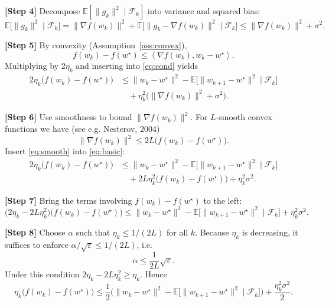 \documentclass{article}
\newcommand{\E}{\mathbb{E}}
\newcommand{\iprod}[2]{\left\langle #1,#2\right\rangle}
\begin{document}
\noindent\textbf{[Step 4]} Decompose $\E[\|g_k\|^{2}\mid\mathcal{F}_k]$ into variance and squared bias:
\begin{equation}
\E\!\big[\|g_k\|^{2}\mid\mathcal{F}_k\big]
= \|\nabla f(w_k)\|^{2} + \E\!\big[\|g_k-\nabla f(w_k)\|^{2}\mid\mathcal{F}_k\big]
\le \|\nabla f(w_k)\|^{2} + \sigma^{2}. \label{eq:variance}
\end{equation}

\noindent\textbf{[Step 5]} By convexity (Assumption~\ref{ass:convex}),
\[
f(w_k)-f(w^{\star})\le \iprod{\nabla f(w_k)}{w_k-w^{\star}} .
\]
Multiplying by $2\eta_k$ and inserting into \eqref{eq:cond} yields
\begin{align}
2\eta_k\big(f(w_k)-f(w^{\star})\big)
&\le \|w_k-w^{\star}\|^{2} - \E\!\big[\|w_{k+1}-w^{\star}\|^{2}\mid\mathcal{F}_k\big] \nonumber\\
&\quad + \eta_k^{2}\big(\|\nabla f(w_k)\|^{2}+\sigma^{2}\big). \label{eq:basic}
\end{align}

\noindent\textbf{[Step 6]} Use smoothness to bound $\|\nabla f(w_k)\|^{2}$.
For $L$‑smooth convex functions we have (see e.g. Nesterov, 2004)
\[
\|\nabla f(w_k)\|^{2}\le 2L\big(f(w_k)-f(w^{\star})\big). \label{eq:smooth}
\]
Insert \eqref{eq:smooth} into \eqref{eq:basic}:
\begin{align}
2\eta_k\big(f(w_k)-f(w^{\star})\big)
&\le \|w_k-w^{\star}\|^{2} - \E\!\big[\|w_{k+1}-w^{\star}\|^{2}\mid\mathcal{F}_k\big] \nonumber\\
&\quad + 2L\eta_k^{2}\big(f(w_k)-f(w^{\star})\big) + \eta_k^{2}\sigma^{2}. \label{eq:pre}
\end{align}

\noindent\textbf{[Step 7]} Bring the terms involving $f(w_k)-f(w^{\star})$ to the left:
\[
\big(2\eta_k - 2L\eta_k^{2}\big)\big(f(w_k)-f(w^{\star})\big)
\le \|w_k-w^{\star}\|^{2} - \E\!\big[\|w_{k+1}-w^{\star}\|^{2}\mid\mathcal{F}_k\big] + \eta_k^{2}\sigma^{2}. \label{eq:after}
\]

\noindent\textbf{[Step 8]} Choose $\alpha$ such that $\eta_k\le 1/(2L)$ for all $k$.  
Because $\eta_k$ is decreasing, it suffices to enforce $\alpha/ \sqrt{\varepsilon}\le 1/(2L)$, i.e.
\[
\alpha \le \frac{1}{2L}\sqrt{\varepsilon}.
\]
Under this condition $2\eta_k-2L\eta_k^{2}\ge \eta_k$. Hence
\begin{equation}
\eta_k\big(f(w_k)-f(w^{\star})\big)
\le \frac{1}{2}\Big(\|w_k-w^{\star}\|^{2} - \E\!\big[\|w_{k+1}-w^{\star}\|^{2}\mid\mathcal{F}_k\big]\Big) +\frac{\eta_k^{2}\sigma^{2}}{2}. \label{eq:simpl}
\end{equation}
\end{document}
